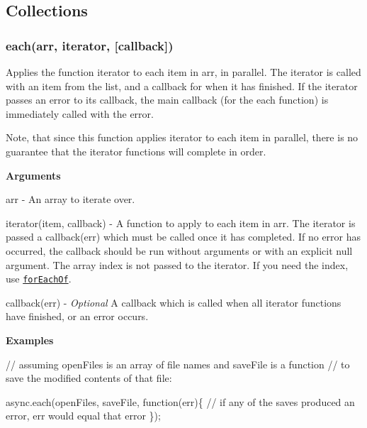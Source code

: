 \subsection*{Collections}

\label{_forEach}%
 \label{_each}%
 \subsubsection*{each(arr, iterator, \mbox{[}callback\mbox{]})}

Applies the function {\ttfamily iterator} to each item in {\ttfamily arr}, in parallel. The {\ttfamily iterator} is called with an item from the list, and a callback for when it has finished. If the {\ttfamily iterator} passes an error to its {\ttfamily callback}, the main {\ttfamily callback} (for the {\ttfamily each} function) is immediately called with the error.

Note, that since this function applies {\ttfamily iterator} to each item in parallel, there is no guarantee that the iterator functions will complete in order.

{\bfseries Arguments}


\begin{DoxyItemize}
\item {\ttfamily arr} -\/ An array to iterate over.
\item {\ttfamily iterator(item, callback)} -\/ A function to apply to each item in {\ttfamily arr}. The iterator is passed a {\ttfamily callback(err)} which must be called once it has completed. If no error has occurred, the {\ttfamily callback} should be run without arguments or with an explicit {\ttfamily null} argument. The array index is not passed to the iterator. If you need the index, use \href{#forEachOf}{\tt {\ttfamily for\+Each\+Of}}.
\item {\ttfamily callback(err)} -\/ {\itshape Optional} A callback which is called when all {\ttfamily iterator} functions have finished, or an error occurs.
\end{DoxyItemize}

{\bfseries Examples}


\begin{DoxyCode}
// assuming openFiles is an array of file names and saveFile is a function
// to save the modified contents of that file:

async.each(openFiles, saveFile, function(err)\{
    // if any of the saves produced an error, err would equal that error
\});
\end{DoxyCode}



